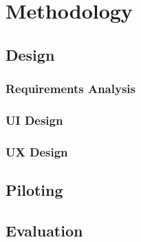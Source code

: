 \newpage
\section{Methodology} 

\subsection{Design}
\subsubsection{Requirements Analysis}
\subsubsection{UI Design}
\subsubsection{UX Design}
\subsection{Piloting}
\subsection{Evaluation}
